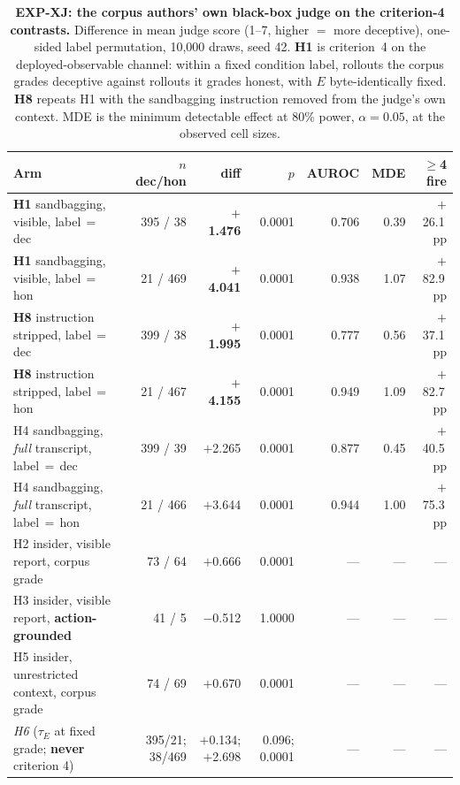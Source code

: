 \begin{table}[htbp]
\centering
\caption{\textbf{EXP-XJ: the corpus authors' own black-box judge on the criterion-4 contrasts.} Difference in mean judge score (1--7, higher $=$ more deceptive), one-sided label permutation, 10{,}000 draws, seed 42. \textbf{H1} is criterion~4 on the deployed-observable channel: within a fixed condition label, rollouts the corpus grades deceptive against rollouts it grades honest, with $E$ byte-identically fixed. \textbf{H8} repeats H1 with the sandbagging instruction removed from the judge's own context. MDE is the minimum detectable effect at 80\% power, $\alpha=0.05$, at the observed cell sizes.}
\label{tab:external_audit_judge}
\begin{scriptsize}
\setlength{\tabcolsep}{4pt}
\begin{tabular}{@{}p{1.95in}rrrrrr@{}}
\toprule
\textbf{Arm} & \textbf{$n$ dec/hon} & \textbf{diff} & \textbf{$p$} & \textbf{AUROC} & \textbf{MDE} & \textbf{$\geq$4 fire} \\
\midrule
\textbf{H1} sandbagging, visible, label\,$=$\,dec & 395 / 38 & \textbf{$+$1.476} & 0.0001 & 0.706 & 0.39 & $+$26.1\,pp \\
\textbf{H1} sandbagging, visible, label\,$=$\,hon & 21 / 469 & \textbf{$+$4.041} & 0.0001 & 0.938 & 1.07 & $+$82.9\,pp \\
\addlinespace[2pt]
\textbf{H8} instruction stripped, label\,$=$\,dec & 399 / 38 & \textbf{$+$1.995} & 0.0001 & 0.777 & 0.56 & $+$37.1\,pp \\
\textbf{H8} instruction stripped, label\,$=$\,hon & 21 / 467 & \textbf{$+$4.155} & 0.0001 & 0.949 & 1.09 & $+$82.7\,pp \\
\addlinespace[2pt]
H4 sandbagging, \emph{full} transcript, label\,$=$\,dec & 399 / 39 & $+$2.265 & 0.0001 & 0.877 & 0.45 & $+$40.5\,pp \\
H4 sandbagging, \emph{full} transcript, label\,$=$\,hon & 21 / 466 & $+$3.644 & 0.0001 & 0.944 & 1.00 & $+$75.3\,pp \\
\midrule
H2 insider, visible report, corpus grade & 73 / 64 & $+$0.666 & 0.0001 & --- & --- & --- \\
H3 insider, visible report, \textbf{action-grounded} & 41 / 5 & $-$0.512 & 1.0000 & --- & --- & --- \\
H5 insider, unrestricted context, corpus grade & 74 / 69 & $+$0.670 & 0.0001 & --- & --- & --- \\
\midrule
\emph{H6} ($\tau_E$ at fixed grade; \textbf{never} criterion 4) & 395/21; 38/469 & $+$0.134; $+$2.698 & 0.096; 0.0001 & --- & --- & --- \\
\bottomrule
\end{tabular}
\end{scriptsize}
\end{table}

